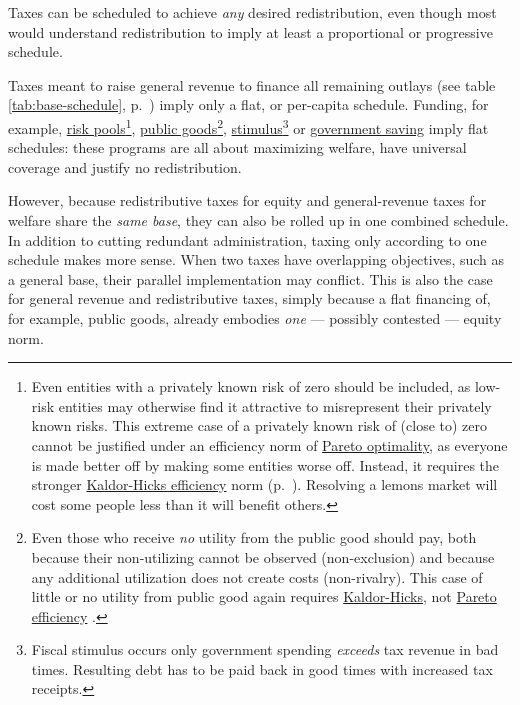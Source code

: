 \begin{description}
	Taxes can be scheduled to achieve \emph{any} desired redistribution, even though most would understand redistribution to imply at least a proportional or progressive schedule. 
	
	Taxes meant to raise general revenue to finance all remaining outlays (see table \ref{tab:base-schedule}, p.~\pageref{tab:base-schedule}) imply only a flat, or per-capita schedule. Funding, for example, \hyperref[sec:adverse-selection]{risk pools}\footnote{
		Even entities with a privately known risk of zero should be included, as low-risk entities may otherwise find it attractive to misrepresent their privately known risks. This extreme case of a privately known risk of (close to) zero cannot be justified under an efficiency norm of \hyperref[sec:Pareto]{Pareto optimality}, as everyone is made better off by making some entities worse off. Instead, it requires the stronger \hyperref[sec:KaldorHicks]{Kaldor-Hicks efficiency} norm (p.~\pageref{sec:Efficiency})\citep{Kaldor1939,Hicks1939}. Resolving a lemons market will cost some people less than it will benefit others.}, 
	\hyperref[sec:public-good]{public goods}\footnote{
		Even those who receive \emph{no} utility from the public good should pay, both because their non-utilizing cannot be observed (non-exclusion) and because any additional utilization does not create costs (non-rivalry). This case of little or no utility from public good again requires \hyperref[sec:KaldorHicks]{Kaldor-Hicks}, not \hyperref[sec:Pareto]{Pareto efficiency} \citep{Kaldor1939,Hicks1939}.}, 
	\hyperref[sec:fiscal-stimulus]{stimulus}\footnote{
		Fiscal stimulus occurs only government spending \emph{exceeds} tax revenue in bad times. Resulting debt has to be paid back in good times with increased tax receipts.} 
	or \hyperref[sec:government-saves]{government saving} imply flat schedules: these programs are all about maximizing welfare, have universal coverage and justify no redistribution. 
	
	However, %
	 \label{sec:redistributionandrevenueareone} because redistributive taxes for equity and general-revenue taxes for welfare share the \emph{same base}, they can also be rolled up in one combined schedule. In addition to cutting redundant administration, taxing only according to one schedule makes more sense. When two taxes have overlapping objectives, such as a general base, their parallel implementation may conflict. This is also the case for general revenue and redistributive taxes, simply because a flat financing of, for example, public goods, already embodies \emph{one} --- possibly contested --- equity norm. 
	
\end{description}

